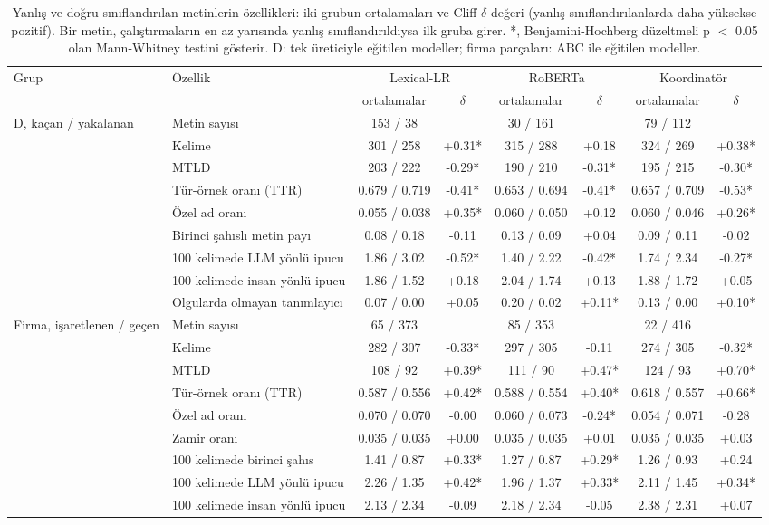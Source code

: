 \begin{table}[t]
\centering
\footnotesize
\caption{Yanlış ve doğru sınıflandırılan metinlerin özellikleri: iki grubun ortalamaları ve Cliff $\delta$ değeri (yanlış sınıflandırılanlarda daha yüksekse pozitif). Bir metin, çalıştırmaların en az yarısında yanlış sınıflandırıldıysa ilk gruba girer. *, Benjamini-Hochberg düzeltmeli p $<$ 0.05 olan Mann-Whitney testini gösterir. D: tek üreticiyle eğitilen modeller; firma parçaları: ABC ile eğitilen modeller.}
\label{tab:contrast}
\begin{tabular}{llcccccc}
\toprule
Grup & Özellik & \multicolumn{2}{c}{Lexical-LR} & \multicolumn{2}{c}{RoBERTa} & \multicolumn{2}{c}{Koordinatör} \\
 & & ortalamalar & $\delta$ & ortalamalar & $\delta$ & ortalamalar & $\delta$ \\
\midrule
D, kaçan / yakalanan & Metin sayısı & 153 / 38 &  & 30 / 161 &  & 79 / 112 &  \\
 & Kelime & 301 / 258 & +0.31* & 315 / 288 & +0.18 & 324 / 269 & +0.38* \\
 & MTLD & 203 / 222 & -0.29* & 190 / 210 & -0.31* & 195 / 215 & -0.30* \\
 & Tür-örnek oranı (TTR) & 0.679 / 0.719 & -0.41* & 0.653 / 0.694 & -0.41* & 0.657 / 0.709 & -0.53* \\
 & Özel ad oranı & 0.055 / 0.038 & +0.35* & 0.060 / 0.050 & +0.12 & 0.060 / 0.046 & +0.26* \\
 & Birinci şahıslı metin payı & 0.08 / 0.18 & -0.11 & 0.13 / 0.09 & +0.04 & 0.09 / 0.11 & -0.02 \\
 & 100 kelimede LLM yönlü ipucu & 1.86 / 3.02 & -0.52* & 1.40 / 2.22 & -0.42* & 1.74 / 2.34 & -0.27* \\
 & 100 kelimede insan yönlü ipucu & 1.86 / 1.52 & +0.18 & 2.04 / 1.74 & +0.13 & 1.88 / 1.72 & +0.05 \\
 & Olgularda olmayan tanımlayıcı & 0.07 / 0.00 & +0.05 & 0.20 / 0.02 & +0.11* & 0.13 / 0.00 & +0.10* \\
Firma, işaretlenen / geçen & Metin sayısı & 65 / 373 &  & 85 / 353 &  & 22 / 416 &  \\
 & Kelime & 282 / 307 & -0.33* & 297 / 305 & -0.11 & 274 / 305 & -0.32* \\
 & MTLD & 108 / 92 & +0.39* & 111 / 90 & +0.47* & 124 / 93 & +0.70* \\
 & Tür-örnek oranı (TTR) & 0.587 / 0.556 & +0.42* & 0.588 / 0.554 & +0.40* & 0.618 / 0.557 & +0.66* \\
 & Özel ad oranı & 0.070 / 0.070 & -0.00 & 0.060 / 0.073 & -0.24* & 0.054 / 0.071 & -0.28 \\
 & Zamir oranı & 0.035 / 0.035 & +0.00 & 0.035 / 0.035 & +0.01 & 0.035 / 0.035 & +0.03 \\
 & 100 kelimede birinci şahıs & 1.41 / 0.87 & +0.33* & 1.27 / 0.87 & +0.29* & 1.26 / 0.93 & +0.24 \\
 & 100 kelimede LLM yönlü ipucu & 2.26 / 1.35 & +0.42* & 1.96 / 1.37 & +0.33* & 2.11 / 1.45 & +0.34* \\
 & 100 kelimede insan yönlü ipucu & 2.13 / 2.34 & -0.09 & 2.18 / 2.34 & -0.05 & 2.38 / 2.31 & +0.07 \\
\bottomrule
\end{tabular}
\end{table}
